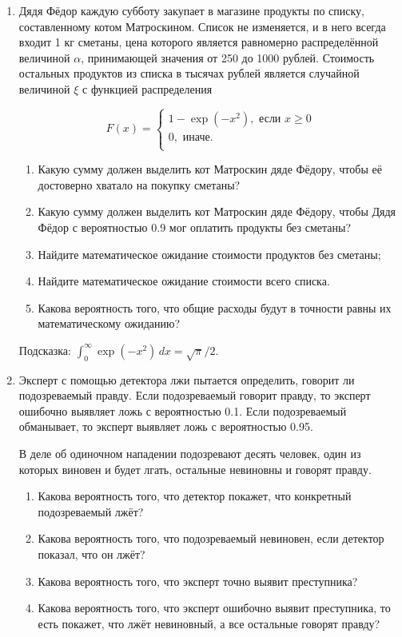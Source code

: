 \begin{enumerate}
\item Дядя Фёдор каждую субботу закупает в магазине продукты по списку, составленному котом Матроскином. Список не изменяется, и в него всегда входит 1 кг сметаны, цена которого является равномерно распределённой величиной $\alpha$, принимающей значения от 250 до 1000 рублей. Стоимость остальных продуктов из списка в тысячах рублей является случайной величиной $\xi$ с функцией распределения

\[
F(x)=\begin{cases}
1-\exp(-x^2 ), \text{ если } x \geq 0 \\
0, \text{ иначе.}\\
\end{cases}
\]

\begin{enumerate}
\item Какую сумму должен выделить кот Матроскин дяде Фёдору, чтобы её достоверно хватало на покупку сметаны?
\item Какую сумму должен выделить кот Матроскин дяде Фёдору, чтобы Дядя Фёдор с вероятностью 0.9 мог оплатить продукты без сметаны?
\item Найдите математическое ожидание стоимости продуктов без сметаны;
\item Найдите математическое ожидание стоимости всего списка.
\item Какова вероятность того, что общие расходы будут в точности равны их математическому ожиданию?
\end{enumerate}

Подсказка: $\int_0^{\infty} \exp(-x^2) \, dx = \sqrt{\pi} / 2$.

\item Эксперт с помощью детектора лжи пытается определить, говорит ли подозреваемый правду. Если подозреваемый говорит правду, то эксперт ошибочно выявляет ложь с вероятностью 0.1. Если подозреваемый обманывает, то эксперт выявляет ложь с вероятностью 0.95.

В деле об одиночном нападении подозревают десять человек, один из которых виновен и будет лгать, остальные невиновны и говорят правду.

\begin{enumerate}
\item Какова вероятность того, что детектор покажет, что конкретный подозреваемый лжёт?
\item Какова вероятность того, что подозреваемый невиновен, если детектор показал, что он лжёт?
\item Какова вероятность того, что эксперт точно выявит преступника?
\item Какова вероятность того, что эксперт ошибочно выявит  преступника, то есть покажет, что лжёт невиновный, а все остальные говорят правду?
\end{enumerate}
\end{enumerate}


